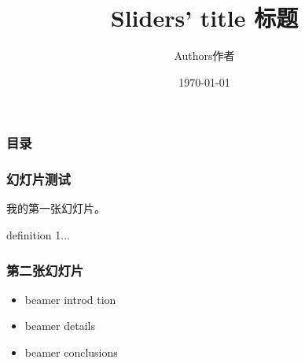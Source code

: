 \documentclass[cjk]{beamer}
\title{Sliders' title 标题}
\author{Authors作者}
\date{\today}
\begin{document}

\begin{CJK*}{GBK}{song}     %

    \begin{frame} %

        \titlepage   

    \end{frame}



    \begin{frame}

        \frametitle{目录}

        \tableofcontents

    \end{frame}



    \begin{frame}

        \frametitle{幻灯片测试}

        \pause

        我的第一张幻灯片。

        \begin{definition}

            definition 1...

        \end{definition}

    \end{frame}

        

    \begin{frame}

        \frametitle{第二张幻灯片}\pause

        \begin{itemize}

         \item beamer introd tion \pause

         \item beamer details \pause

         \item beamer conclusions

        \end{itemize}

    \end{frame}

    

\end{CJK*}
\end{document}

